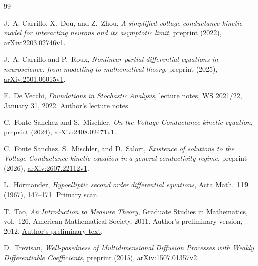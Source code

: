 \begin{thebibliography}{99}

J.~A. Carrillo, X.~Dou, and Z.~Zhou,
\emph{A simplified voltage-conductance kinetic model for interacting
neurons and its asymptotic limit},
preprint (2022),
\href{https://arxiv.org/abs/2203.02746v1}{arXiv:2203.02746v1}.

J.~A. Carrillo and P.~Roux,
\emph{Nonlinear partial differential equations in neuroscience:
from modelling to mathematical theory},
preprint (2025),
\href{https://arxiv.org/abs/2501.06015v1}{arXiv:2501.06015v1}.

F.~De Vecchi,
\emph{Foundations in Stochastic Analysis},
lecture notes, WS 2021/22, January 31, 2022.
\href{https://mgubi.github.io/store/iam/stochastic-analysis-ss22/Foundations_in_Stochastic_Analysis.pdf}{Author's lecture notes}.

C.~Fonte Sanchez and S.~Mischler,
\emph{On the Voltage-Conductance kinetic equation},
preprint (2024),
\href{https://arxiv.org/abs/2408.02471v1}{arXiv:2408.02471v1}.

C.~Fonte Sanchez, S.~Mischler, and D.~Salort,
\emph{Existence of solutions to the Voltage-Conductance kinetic
equation in a general conductivity regime},
preprint (2026),
\href{https://arxiv.org/abs/2607.22112v1}{arXiv:2607.22112v1}.

L.~H\"ormander,
\emph{Hypoelliptic second order differential equations},
Acta Math. \textbf{119} (1967), 147--171.
\href{https://archive.ymsc.tsinghua.edu.cn/pacm_download/117/6044-11511_2006_Article_BF02392081.pdf}{Primary scan}.

T.~Tao,
\emph{An Introduction to Measure Theory},
Graduate Studies in Mathematics, vol.~126, American Mathematical
Society, 2011. Author's preliminary version, 2012.
\href{https://terrytao.wordpress.com/wp-content/uploads/2012/12/gsm-126-tao5-measure-book.pdf}{Author's preliminary text}.

D.~Trevisan,
\emph{Well-posedness of Multidimensional Diffusion Processes with
Weakly Differentiable Coefficients},
preprint (2015),
\href{https://arxiv.org/abs/1507.01357v2}{arXiv:1507.01357v2}.

\end{thebibliography}
